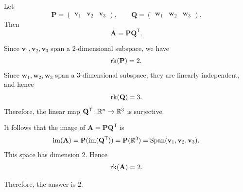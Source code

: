    \begin{solution}
        Let
        \[
            \mathbf{P}
            =
            \begin{pmatrix}
                \mathbf{v}_1 & \mathbf{v}_2 & \mathbf{v}_3
            \end{pmatrix},
            \qquad
            \mathbf{Q}
            =
            \begin{pmatrix}
                \mathbf{w}_1 & \mathbf{w}_2 & \mathbf{w}_3
            \end{pmatrix}.
        \]
        Then
        \[
            \mathbf{A}
            =
            \mathbf{P}\mathbf{Q}^{\mathsf T}.
        \]

        Since $\mathbf{v}_1,\mathbf{v}_2,\mathbf{v}_3$ span a $2$-dimensional subspace, we have
        \[
            \operatorname{rk}(\mathbf{P})=2.
        \]
        Since $\mathbf{w}_1,\mathbf{w}_2,\mathbf{w}_3$ span a $3$-dimensional subspace, they are
        linearly independent, and hence
        \[
            \operatorname{rk}(\mathbf{Q})=3.
        \]
        Therefore, the linear map $\mathbf{Q}^{\mathsf T}\colon\mathbb{R}^n\to\mathbb{R}^3$ is surjective.

        It follows that the image of $\mathbf{A}=\mathbf{P}\mathbf{Q}^{\mathsf T}$ is
        \[
            \operatorname{im}(\mathbf{A})
            =
            \mathbf{P}(\operatorname{im}(\mathbf{Q}^{\mathsf T}))
            =
            \mathbf{P}(\mathbb{R}^3)
            =
            \operatorname{Span}(\mathbf{v}_1,\mathbf{v}_2,\mathbf{v}_3).
        \]
        This space has dimension $2$. Hence
        \[
            \operatorname{rk}(\mathbf{A})=2.
        \]

        Therefore, the answer is $\boxed{2}$.
    \end{solution}

